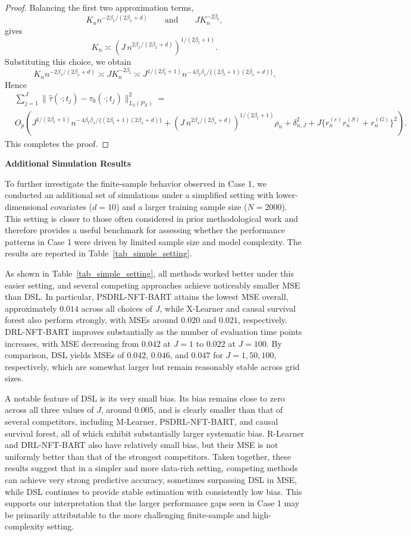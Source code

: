 \documentclass{article}
\newenvironment{proofof}[1]
{\renewcommand{\proofname}{Proof of #1}\begin{proof}}
{\end{proof}}
\begin{document}
\begin{proofof}{Theorem \ref{thm:joint_pseudo}:}
Balancing the first two approximation terms,
\[
K_n n^{-2\beta_x/(2\beta_x+d)}
\qquad\text{and}\qquad
J K_n^{-2\beta_t},
\]
gives
\[
K_n
\asymp
\left(
J\,n^{2\beta_x/(2\beta_x+d)}
\right)^{1/(2\beta_t+1)}.
\]
Substituting this choice, we obtain
\[
K_n n^{-2\beta_x/(2\beta_x+d)}
\asymp
J K_n^{-2\beta_t}
\asymp
J^{1/(2\beta_t+1)}
n^{-\,4\beta_t\beta_x/\{(2\beta_t+1)(2\beta_x+d)\}}.
\]
Hence
\begin{align*}
& \sum_{j=1}^J
\|\hat\tau(\cdot;t_j)-\tau_0(\cdot;t_j)\|_{L_2(P_X)}^2
= \\
& O_p\!\left(
J^{1/(2\beta_t+1)}
n^{-\,4\beta_t\beta_x/\{(2\beta_t+1)(2\beta_x+d)\}}
+
\left(
J\,n^{2\beta_x/(2\beta_x+d)}
\right)^{1/(2\beta_t+1)}\rho_n
+
\delta_{n,J}^2
+
J\{r_n^{(e)}r_n^{(S)}+r_n^{(G)}\}^2
\right).
\end{align*}
 This completes the proof.
\end{proofof}

\noindent
{\bf Additional Simulation Results}

{To further investigate the finite-sample behavior observed in Case 1, we conducted an additional set of simulations under a simplified setting with lower-dimensional covariates ($d=10$) and a larger training sample size ($N=2000$). This setting is closer to those  often considered in prior methodological work and therefore provides a useful benchmark for assessing whether the performance patterns in Case 1 were driven by limited sample size and model complexity. The results are reported in Table~\ref{tab_simple_setting}.}

{As shown in Table~\ref{tab_simple_setting}, all methods worked better under this easier setting, and several competing approaches achieve noticeably smaller MSE than DSL. In particular, PSDRL-NFT-BART attains the lowest MSE overall, approximately $0.014$ across all choices of $J$, while X-Learner and causal survival forest also perform strongly, with MSEs around $0.020$ and $0.021$, respectively. DRL-NFT-BART improves substantially as the number of evaluation time points increases, with MSE decreasing from $0.042$ at $J=1$ to $0.022$ at $J=100$. By comparison, DSL yields MSEs of $0.042$, $0.046$, and $0.047$ for $J=1,50,100$, respectively, which are somewhat larger but remain reasonably stable across grid sizes.}

{A notable feature of DSL is its very small bias. Its bias remains close to zero across all three values of $J$, around $0.005$, and is clearly smaller than that of several competitors, including M-Learner, PSDRL-NFT-BART, and causal survival forest, all of which exhibit substantially larger systematic bias. R-Learner and DRL-NFT-BART also have relatively small bias, but their MSE is not uniformly better than that of the strongest competitors. Taken together, these results suggest that in a simpler and more data-rich setting, competing methods can achieve very strong predictive accuracy, sometimes surpassing DSL in MSE, while DSL continues to provide stable estimation with consistently low bias. This supports our interpretation that the larger performance gaps seen in Case 1 may be primarily attributable to the more challenging finite-sample and high-complexity setting.}
\end{document}
